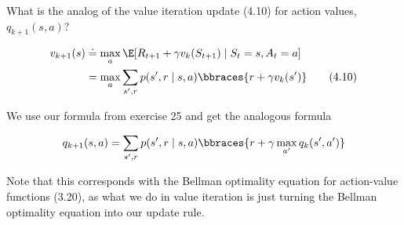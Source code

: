 \begin{exercise}
  What is the analog of the value iteration update (4.10) for action values, $q_{k+1}(s, a)$?

  \begin{align*}
      v_{k+1}(s)
      & \doteq
      \max_a
          \E[R_{t+1} + \gamma v_k(S_{t+1}) \mid S_t = s, A_t = a] \\
      & =
      \max_a
          \sum_{s^\prime, r}
              p(s^\prime, r \mid s, a)
              \bbraces{r + \gamma v_k(s^\prime)} \tag{4.10}
  \end{align*}

\end{exercise}

\begin{solution}
  We use our formula from exercise 25 and get the analogous formula

  \begin{align*}
    q_{k+1}(s,a) = \sum_{s^\prime, r}
        p(s^\prime, r \mid s, a)
        \bbraces{r + \gamma \max_{a^\prime} q_k(s^\prime, a^\prime)}
  \end{align*}

  Note that this corresponds with the Bellman optimality equation for action-value functions (3.20), as what we do in value iteration is just turning the Bellman optimality equation into our update rule.
\end{solution}
